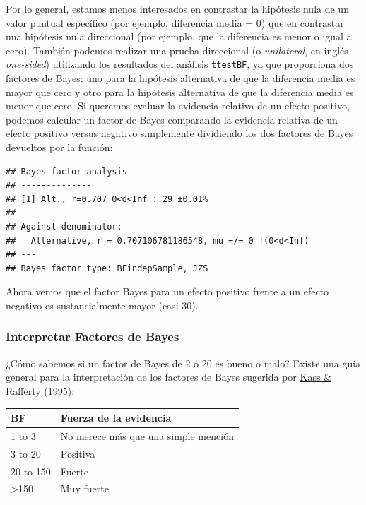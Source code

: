\documentclass[
  12pt,
]{book}
\begin{document}
Por lo general, estamos menos interesados en contrastar la hipótesis nula de un valor puntual específico (por ejemplo, diferencia media = 0) que en contrastar una hipótesis nula direccional (por ejemplo, que la diferencia es menor o igual a cero). También podemos realizar una prueba direccional (o \emph{unilateral}, en inglés \emph{one-sided}) utilizando los resultados del análisis \texttt{ttestBF}, ya que proporciona dos factores de Bayes: uno para la hipótesis alternativa de que la diferencia media es mayor que cero y otro para la hipótesis alternativa de que la diferencia media es menor que cero. Si queremos evaluar la evidencia relativa de un efecto positivo, podemos calcular un factor de Bayes comparando la evidencia relativa de un efecto positivo versus negativo simplemente dividiendo los dos factores de Bayes devueltos por la función:

\begin{verbatim}
## Bayes factor analysis
## --------------
## [1] Alt., r=0.707 0<d<Inf : 29 ±0.01%
## 
## Against denominator:
##   Alternative, r = 0.707106781186548, mu =/= 0 !(0<d<Inf) 
## ---
## Bayes factor type: BFindepSample, JZS
\end{verbatim}

Ahora vemos que el factor Bayes para un efecto positivo frente a un efecto negativo es sustancialmente mayor (casi 30).

\hypertarget{interpretar-factores-de-bayes}{%
\subsubsection{Interpretar Factores de Bayes}\label{interpretar-factores-de-bayes}}

¿Cómo sabemos si un factor de Bayes de 2 o 20 es bueno o malo? Existe una guía general para la interpretación de los factores de Bayes sugerida por \href{https://www.andrew.cmu.edu/user/kk3n/simplicity/KassRaftery1995.pdf}{Kass \& Rafferty (1995)}:

\begin{longtable}[]{@{}ll@{}}
\toprule
BF & Fuerza de la evidencia \\
\midrule
\endhead
1 to 3 & No merece más que una simple mención \\
3 to 20 & Positiva \\
20 to 150 & Fuerte \\
\textgreater150 & Muy fuerte \\
\bottomrule
\end{longtable}
\end{document}
